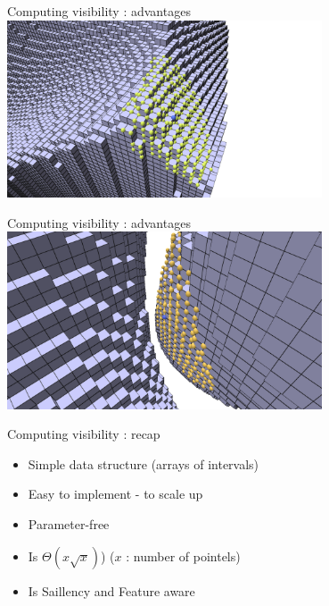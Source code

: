 \documentclass[11pt]{beamer}
\begin{document}
    \begin{frame}{Computing visibility : advantages}
        \centering
        \hspace{1em}\includegraphics[width=0.7\textwidth,xshift=1em]{pictures/visibility_from_given_point_r_10}
        \newline
    \end{frame}
    \begin{frame}{Computing visibility : advantages}
        \centering
        \includegraphics[width=0.7\textwidth]{pictures/visibility_aware_of_features}
        \newline
    \end{frame}
    \begin{frame}{Computing visibility : recap}
        \begin{itemize}
            \item Simple data structure (arrays of intervals)
            \item Easy to implement - to scale up
            \item Parameter-free
            \item Is $\Theta \left(x \sqrt{x}\right)$) ($x$ : number of pointels)
            \item Is Saillency and Feature aware
        \end{itemize}
    \end{frame}
\end{document}
